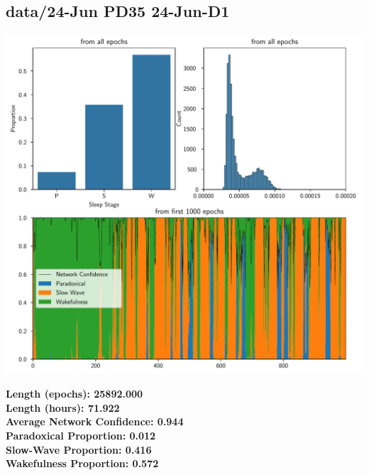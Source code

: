         \subsection*{ data/24-Jun PD35 24-Jun-D1 }
        \begin{center}
        \begin{adjustbox}{width=1\textwidth}
        \includegraphics[page=20]{figs.pdf}
        \end{adjustbox}
        \end{center}
        \large\textbf{Length (epochs): 25892.000}\\
        \textbf{Length (hours): 71.922}\\
        \textbf{Average Network Confidence: 0.944}\\
        \textbf{Paradoxical Proportion: 0.012}\\
        \textbf{Slow-Wave Proportion: 0.416}\\
        \textbf{Wakefulness Proportion: 0.572}\\
        

